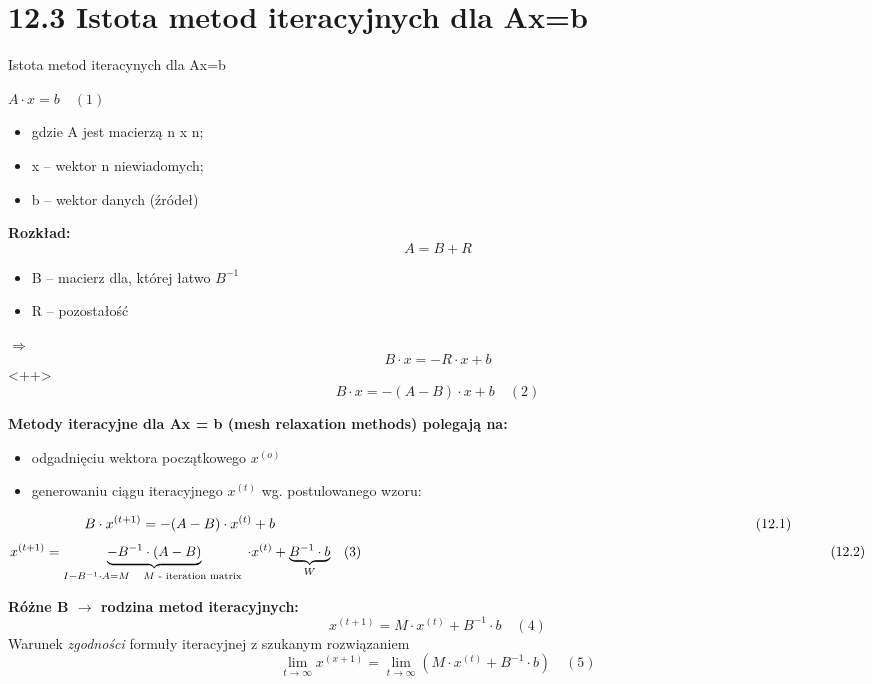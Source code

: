 \section{12.3 Istota metod iteracyjnych dla Ax=b}

\begin{frame}{Istota metod iteracynych dla Ax=b}
    \begin{center}
      $A\cdot x=b\quad(1)$
    \end{center}
    \begin{itemize}
      \item gdzie A jest macierzą n x n;
      \item x -- wektor n niewiadomych;
      \item b -- wektor danych (źródeł)
    \end{itemize}
\end{frame}

\begin{frame}
  \begin{block}{\textbf{Rozkład:}}
      $$A=B+R$$
    \begin{itemize}
      \item B -- macierz dla, której łatwo $B^{-1}$
      \item R -- pozostałość
    \end{itemize}
    $\Rightarrow$
    $$B\cdot x=-R\cdot x+b$$<++>
  $$\boxed{B\cdot x=-(A-B)\cdot x+b}\quad(2)$$
  \end{block}
\end{frame}

\begin{frame}{}
    \textbf{Metody iteracyjne dla Ax = b (mesh relaxation methods) polegają na:}
    \begin{itemize}
      \item odgadnięciu wektora początkowego $x^{(o)}$
      \item generowaniu ciągu iteracyjnego $x^{(t)}$ wg. postulowanego wzoru:
    \end{itemize}
    $$B\cdot x^{(t+1)}=-(A-B)\cdot x^{(t)}+b \hskip \textwidth minus \textwidth (12.1)$$
    $$x^{(t+1)}=\underbrace{-B^{-1}\cdot (A-B)}_{I-B^{-1}\cdot A=M \quad M\text{ - iteration matrix }} \cdot x^{(t)}+\underbrace{B^{-1}\cdot b}_{W}\quad(3) \hskip \textwidth minus \textwidth (12.2)$$
\end{frame}

\begin{frame}{}
    \textbf{Różne B $\rightarrow$ rodzina metod iteracyjnych:}
    $$\boxed{x^{(t+1)}=M\cdot x^{(t)}+B^{-1}\cdot b}\quad(4)$$
    Warunek \emph{zgodności} formuły iteracyjnej z szukanym rozwiązaniem
    $$\lim_{t\to\infty} x^{(x+1)}= \lim_{t\to\infty}  (M\cdot x^{(t)}+B^{-1}\cdot b) \quad (5)$$
\end{frame}


